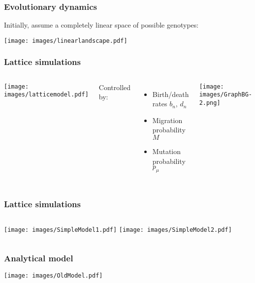 \documentclass{beamer}
\begin{document}
\begin{frame}
    \frametitle{Evolutionary dynamics}
    Initially, assume a completely linear space of possible genotypes:
    \begin{center}
    \texttt{[image: images/linearlandscape.pdf]}
    \end{center}
\end{frame}


\begin{frame}
\frametitle{Lattice simulations}

\begin{columns}[c]
    \texttt{[image: images/latticemodel.pdf]}
    \;

    Controlled by:
    \begin{itemize}
        \item Birth/death rates $b_n$, $d_n$
        \item Migration probability $M$
        \item Mutation probability $p_\mu$
    \end{itemize}
    \texttt{[image: images/GraphBG-2.png]}
\end{columns}
\end{frame}

\begin{frame}
\frametitle{Lattice simulations}
\begin{columns}[c]
    \texttt{[image: images/SimpleModel1.pdf]} 
    \texttt{[image: images/SimpleModel2.pdf]} 
\end{columns}
\end{frame}


\begin{frame}
    \frametitle{Analytical model}

\begin{center}
\texttt{[image: images/OldModel.pdf]}
\end{center}

\end{frame}
\end{document}

